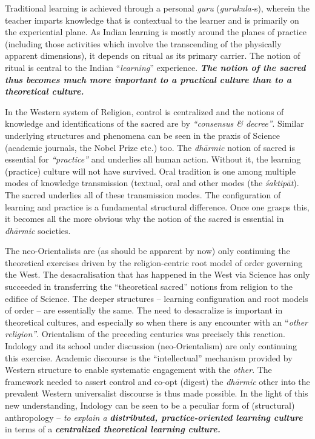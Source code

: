 Traditional learning is achieved through a personal \textit{guru} (\textit{gurukula-}s), wherein the teacher imparts knowledge that is contextual to the learner and is primarily on the experiential plane. As Indian learning is mostly around the planes of practice (including those activities which involve the transcending of the physically apparent dimensions), it depends on ritual as its primary carrier. The notion of ritual is central to the Indian “\textit{learning}” experience. \textbf{\textit{The notion of the sacred thus becomes much more important to a practical culture than to a theoretical culture.}}

In the Western system of Religion, control is centralized and the notions of knowledge and identifications of the sacred are by \textit{“consensus \& decree”}. Similar underlying structures and phenomena can be seen in the praxis of Science (academic journals, the Nobel Prize etc.) too. The \textit{dhārmic} notion of sacred is essential for \textit{“practice”} and underlies all human action. Without it, the learning (practice) culture will not have survived. Oral tradition is one among multiple modes of knowledge transmission (textual, oral and other modes (the \textit{śaktipāt}). The sacred underlies all of these transmission modes. The configuration of learning and practice is a fundamental structural difference. Once one grasps this, it becomes all the more obvious why the notion of the sacred is essential in \textit{dhārmic} societies.

The neo-Orientalists are (as should be apparent by now) only continuing the theoretical exercises driven by the religion-centric root model of order governing the West. The desacralisation that has happened in the West via Science has only succeeded in transferring the “theoretical sacred” notions from religion to the edifice of Science. The deeper structures – learning configuration and root models of order – are essentially the same. The need to desacralize is important in theoretical cultures, and especially so when there is any encounter with an “\textit{other religion”}. Orientalism of the preceding centuries was precisely this reaction. Indology and its school under discussion (neo-Orientalism) are only continuing this exercise. Academic discourse is the “intellectual” mechanism provided by Western structure to enable systematic engagement with the \textit{other}. The framework needed to assert control and co-opt (digest) the \textit{dhārmic} other into the prevalent Western universalist discourse is thus made possible. In the light of this new understanding, Indology can be seen to be a peculiar form of (structural) anthropology – \textit{to} \textit{explain a } \textbf{\textit{distributed, practice-oriented learning culture}} in terms of a \textbf{\textit{centralized theoretical learning culture.}}


